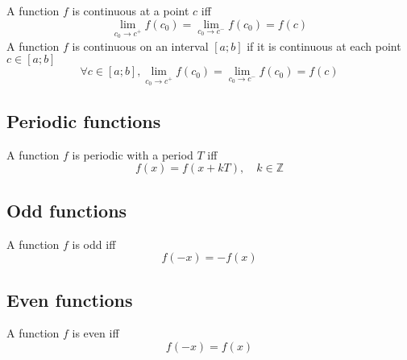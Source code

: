 \documentclass{article}
\begin{document}
A function \(f\) is continuous at a point \(c\) iff
\[
    \lim_{c_0 \to c^+} f(c_0) = \lim_{c_0 \to c^-} f(c_0) = f(c)
\]
A function \(f\) is continuous on an interval \([a;b]\) if it is continuous at each point \(c \in [a;b]\)
\[
    \forall c \in [a;b],
    \lim_{c_0 \to c^+} f(c_0) = \lim_{c_0 \to c^-} f(c_0) = f(c)
\]

\subsection{Periodic functions}

A function \(f\) is periodic with a period \(T\) iff
\[
    f(x) = f(x + kT), \quad k \in \mathbb{Z}
\]

\subsection{Odd functions}

A function \(f\) is odd iff
\[
    f(-x) = -f(x)
\]

\subsection{Even functions}

A function \(f\) is even iff
\[
    f(-x) = f(x)
\]
\end{document}
